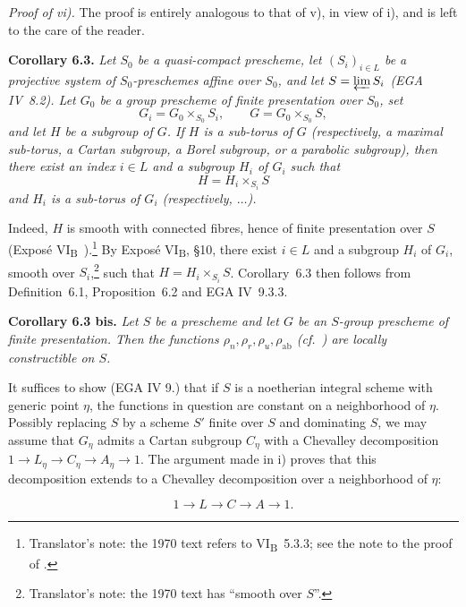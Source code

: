 \emph{Proof of vi).} The proof is entirely analogous to that of v), in view of i), and is left to the care of the reader.

\textbf{Corollary 6.3.} \emph{Let \(S_0\) be a quasi-compact
prescheme, let \((S_i)_{i\in L}\) be a projective system of
\(S_0\)-preschemes affine over \(S_0\), and let
\(S=\varprojlim S_i\) (EGA IV~8.2). Let \(G_0\) be a group
prescheme of finite presentation over \(S_0\), set
\[
  G_i=G_0\times_{S_0}S_i,\qquad G=G_0\times_{S_0}S,
\]
and let \(H\) be a subgroup of \(G\). If \(H\) is a sub-torus of
\(G\) (respectively, a maximal sub-torus, a Cartan subgroup, a Borel
subgroup, or a parabolic subgroup), then there exist an index
\(i\in L\) and a subgroup \(H_i\) of \(G_i\) such that
\[
  H=H_i\times_{S_i}S
\]
and \(H_i\) is a sub-torus of \(G_i\) (respectively, \(\ldots\)).}

Indeed, \(H\) is smooth with connected fibres, hence of finite
presentation over \(S\) (Exposé VI\textsubscript{B}~).\footnote{Translator's note: the 1970 text refers to VI\textsubscript{B}~5.3.3; see the note to the proof of .} By
Exposé VI\textsubscript{B}, \S10, there exist \(i\in L\) and a
subgroup \(H_i\) of \(G_i\), smooth over \(S_i\),\footnote{Translator's note: the 1970 text has ``smooth over \(S\)''.} such that
\(H=H_i\times_{S_i}S\). Corollary~6.3 then follows from
Definition~6.1, Proposition~6.2 and EGA IV~9.3.3.

\textbf{Corollary 6.3 bis.} \emph{Let \(S\) be a prescheme and let
\(G\) be an \(S\)-group prescheme of finite presentation. Then the
functions \(\rho_n,\rho_r,\rho_u,\rho_{\mathrm{ab}}\) (cf.~)
are locally constructible on \(S\).}

It suffices to show (EGA IV 9.) that if \(S\) is a noetherian integral scheme with generic point \(\eta\), the functions in
question are constant on a neighborhood of \(\eta\). Possibly replacing \(S\) by a scheme \(S'\) finite over \(S\) and
dominating \(S\), we may assume that \(G_{\eta}\) admits a Cartan subgroup \(C_{\eta}\) with a Chevalley decomposition \(1 \to
L_{\eta} \to C_{\eta} \to A_{\eta} \to 1\). The argument made in  i) proves that this decomposition extends to a
Chevalley decomposition over a neighborhood of \(\eta\):

\[ 1 \longrightarrow L \longrightarrow C \longrightarrow A \longrightarrow 1. \]

